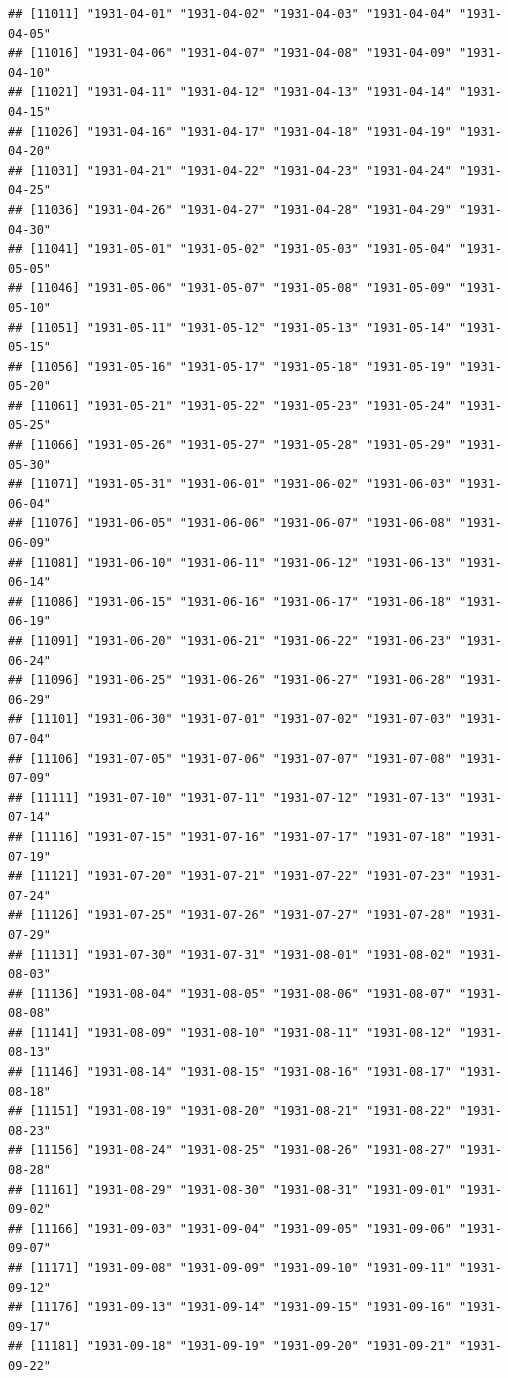 \documentclass{article}\usepackage[]{graphicx}\usepackage[]{color}
\makeatletter
\newenvironment{kframe}{%
 \def\at@end@of@kframe{}%
 \ifinner\ifhmode%
  \def\at@end@of@kframe{\end{minipage}}%
  \begin{minipage}{\columnwidth}%
 \fi\fi%
 \def\FrameCommand##1{\hskip\@totalleftmargin \hskip-\fboxsep
 \colorbox{shadecolor}{##1}\hskip-\fboxsep
     \hskip-\linewidth \hskip-\@totalleftmargin \hskip\columnwidth}%
 \MakeFramed {\advance\hsize-\width
   \@totalleftmargin\z@ \linewidth\hsize
   \@setminipage}}%
 {\par\unskip\endMakeFramed%
 \at@end@of@kframe}
\newenvironment{knitrout}{}{} %
\makeatother
\begin{document}
\begin{description}
\begin{knitrout}
\begin{kframe}
\begin{verbatim}
## [11011] "1931-04-01" "1931-04-02" "1931-04-03" "1931-04-04" "1931-04-05"
## [11016] "1931-04-06" "1931-04-07" "1931-04-08" "1931-04-09" "1931-04-10"
## [11021] "1931-04-11" "1931-04-12" "1931-04-13" "1931-04-14" "1931-04-15"
## [11026] "1931-04-16" "1931-04-17" "1931-04-18" "1931-04-19" "1931-04-20"
## [11031] "1931-04-21" "1931-04-22" "1931-04-23" "1931-04-24" "1931-04-25"
## [11036] "1931-04-26" "1931-04-27" "1931-04-28" "1931-04-29" "1931-04-30"
## [11041] "1931-05-01" "1931-05-02" "1931-05-03" "1931-05-04" "1931-05-05"
## [11046] "1931-05-06" "1931-05-07" "1931-05-08" "1931-05-09" "1931-05-10"
## [11051] "1931-05-11" "1931-05-12" "1931-05-13" "1931-05-14" "1931-05-15"
## [11056] "1931-05-16" "1931-05-17" "1931-05-18" "1931-05-19" "1931-05-20"
## [11061] "1931-05-21" "1931-05-22" "1931-05-23" "1931-05-24" "1931-05-25"
## [11066] "1931-05-26" "1931-05-27" "1931-05-28" "1931-05-29" "1931-05-30"
## [11071] "1931-05-31" "1931-06-01" "1931-06-02" "1931-06-03" "1931-06-04"
## [11076] "1931-06-05" "1931-06-06" "1931-06-07" "1931-06-08" "1931-06-09"
## [11081] "1931-06-10" "1931-06-11" "1931-06-12" "1931-06-13" "1931-06-14"
## [11086] "1931-06-15" "1931-06-16" "1931-06-17" "1931-06-18" "1931-06-19"
## [11091] "1931-06-20" "1931-06-21" "1931-06-22" "1931-06-23" "1931-06-24"
## [11096] "1931-06-25" "1931-06-26" "1931-06-27" "1931-06-28" "1931-06-29"
## [11101] "1931-06-30" "1931-07-01" "1931-07-02" "1931-07-03" "1931-07-04"
## [11106] "1931-07-05" "1931-07-06" "1931-07-07" "1931-07-08" "1931-07-09"
## [11111] "1931-07-10" "1931-07-11" "1931-07-12" "1931-07-13" "1931-07-14"
## [11116] "1931-07-15" "1931-07-16" "1931-07-17" "1931-07-18" "1931-07-19"
## [11121] "1931-07-20" "1931-07-21" "1931-07-22" "1931-07-23" "1931-07-24"
## [11126] "1931-07-25" "1931-07-26" "1931-07-27" "1931-07-28" "1931-07-29"
## [11131] "1931-07-30" "1931-07-31" "1931-08-01" "1931-08-02" "1931-08-03"
## [11136] "1931-08-04" "1931-08-05" "1931-08-06" "1931-08-07" "1931-08-08"
## [11141] "1931-08-09" "1931-08-10" "1931-08-11" "1931-08-12" "1931-08-13"
## [11146] "1931-08-14" "1931-08-15" "1931-08-16" "1931-08-17" "1931-08-18"
## [11151] "1931-08-19" "1931-08-20" "1931-08-21" "1931-08-22" "1931-08-23"
## [11156] "1931-08-24" "1931-08-25" "1931-08-26" "1931-08-27" "1931-08-28"
## [11161] "1931-08-29" "1931-08-30" "1931-08-31" "1931-09-01" "1931-09-02"
## [11166] "1931-09-03" "1931-09-04" "1931-09-05" "1931-09-06" "1931-09-07"
## [11171] "1931-09-08" "1931-09-09" "1931-09-10" "1931-09-11" "1931-09-12"
## [11176] "1931-09-13" "1931-09-14" "1931-09-15" "1931-09-16" "1931-09-17"
## [11181] "1931-09-18" "1931-09-19" "1931-09-20" "1931-09-21" "1931-09-22"

\end{verbatim}
\end{kframe}
\end{knitrout}
\end{description}
\end{document}

